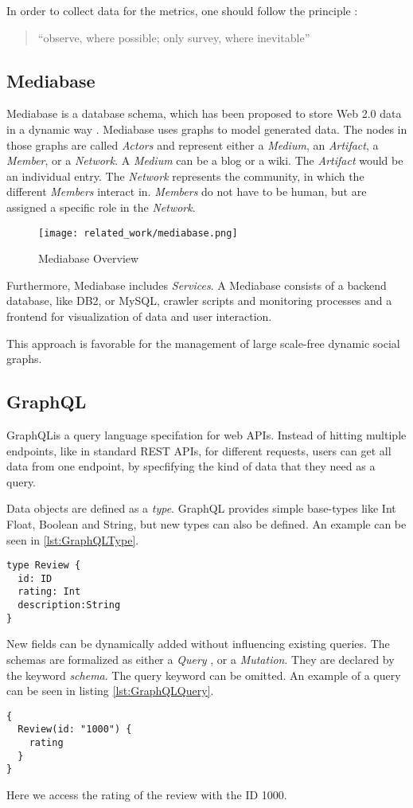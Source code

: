 In order to collect data for the metrics, one should follow the principle \cite{RKJa15}:
\begin{quotation}
	``observe, where possible; only survey,	where inevitable''
\end{quotation}

\subsection{Mediabase}
Mediabase is a database schema, which has been proposed to store Web 2.0 data in a dynamic way \cite{KlPe08}. Mediabase uses graphs to model generated data. The nodes in those graphs are called \emph{Actors} and represent either a \emph{ Medium}, an \emph{Artifact}, a \emph{Member}, or a \emph{Network}. A \emph{ Medium} can be a blog or a wiki. The \emph{Artifact} would be an individual entry. The \emph{Network} represents the community, in which the different \emph{Members} interact in. \emph{Members} do not have to be human, but are assigned a specific role in the \emph{Network}.
\begin{figure}
	\centering
	\texttt{[image: related\_work/mediabase.png]}
	\caption{Mediabase Overview \cite{Klam10e}}
\end{figure}
Furthermore, Mediabase includes \emph{Services}. A Mediabase consists of a backend database, like DB2, or MySQL, crawler scripts and monitoring processes and a frontend for visualization of data  and user interaction.

This approach is favorable for the management of large scale-free dynamic social graphs.

\subsection{GraphQL}
GraphQL\footnotemark is a query language specifation for web APIs. Instead of hitting multiple endpoints, like in standard REST APIs, for different requests, users can get all data from one endpoint, by specfifying the kind of data that they need as a query.


Data objects are defined as a \emph{type}. GraphQL provides simple base-types like Int Float, Boolean and String, but new types can also be defined. An example can be seen in \ref{lst:GraphQLType}.
\begin{lstlisting}[caption={Example of a GraphQL schema},captionpos=b,label={lst:GraphQLType}]
type Review {
  id: ID
  rating: Int
  description:String
}
\end{lstlisting}
New fields can be dynamically added without influencing existing queries. The schemas are formalized as either a \emph{Query }, or a \emph{Mutation}. They are declared by the keyword \emph{schema}. The query keyword can be omitted. An example of a query can be seen in listing \ref{lst:GraphQLQuery}.
\begin{lstlisting}[caption={Example of a GraphQL Query},captionpos=b,label={lst:GraphQLQuery}]
{
  Review(id: "1000") {
    rating
  }
}
\end{lstlisting}
Here we access the rating of the review with the ID 1000.

